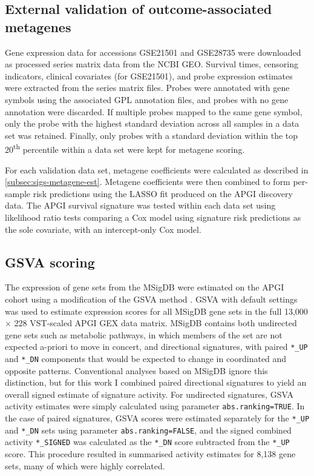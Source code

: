 \documentclass[dissertation.tex]{subfiles}
\begin{document}
\subsection{External validation of outcome-associated metagenes}
Gene expression data for accessions GSE21501 and GSE28735 were downloaded as processed series matrix data from the \gls{NCBI} \gls{GEO}.  Survival times, censoring indicators, clinical covariates (for GSE21501), and probe expression estimates were extracted from the series matrix files.  Probes were annotated with gene symbols using the associated GPL annotation files, and probes with no gene annotation were discarded.  If multiple probes mapped to the same gene symbol, only the probe with the highest standard deviation across all samples in a data set was retained.  Finally, only probes with a standard deviation within the top 20\textsuperscript{th} percentile within a data set were kept for metagene scoring.

For each validation data set, metagene coefficients were calculated as described in \cref{subsec:sigs-metagene-est}.  Metagene coefficients were then combined to form per-sample risk predictions using the \gls{LASSO} fit produced on the \gls{APGI} discovery data.  The \gls{APGI} survival signature was tested within each data set using likelihood ratio tests comparing a Cox model using signature risk predictions as the sole covariate, with an intercept-only Cox model.

\subsection{\acrshort{GSVA} scoring}
The expression of gene sets from the \gls{MSigDB} \cite{Subramanian2005} were estimated on the \gls{APGI} cohort using a modification of the \gls{GSVA} method \cite{Hanzelmann2013}.  \gls{GSVA} with default settings was used to estimate expression scores for all \gls{MSigDB} gene sets in the full 13,000 $\times$ 228 \gls{VST}-scaled \gls{APGI} \gls{GEX} data matrix.  \gls{MSigDB} contains both undirected gene sets such as metabolic pathways, in which members of the set are not expected a-priori to move in concert, and directional signatures, with paired \texttt{*\_UP} and \texttt{*\_DN} components that would be expected to change in coordinated and opposite patterns.  Conventional analyses based on \gls{MSigDB} ignore this distinction, but for this work I combined paired directional signatures to yield an overall signed estimate of signature activity.  For undirected signatures, \gls{GSVA} activity estimates were simply calculated using parameter \texttt{abs.ranking=TRUE}.  In the case of paired signatures, \gls{GSVA} scores were estimated separately for the \texttt{*\_UP} and \texttt{*\_DN} sets using parameter \texttt{abs.ranking=FALSE}, and the signed combined activity \texttt{*\_SIGNED} was calculated as the \texttt{*\_DN} score subtracted from the \texttt{*\_UP} score.  This procedure resulted in summarised activity estimates for 8,138 gene sets, many of which were highly correlated.
\end{document}
